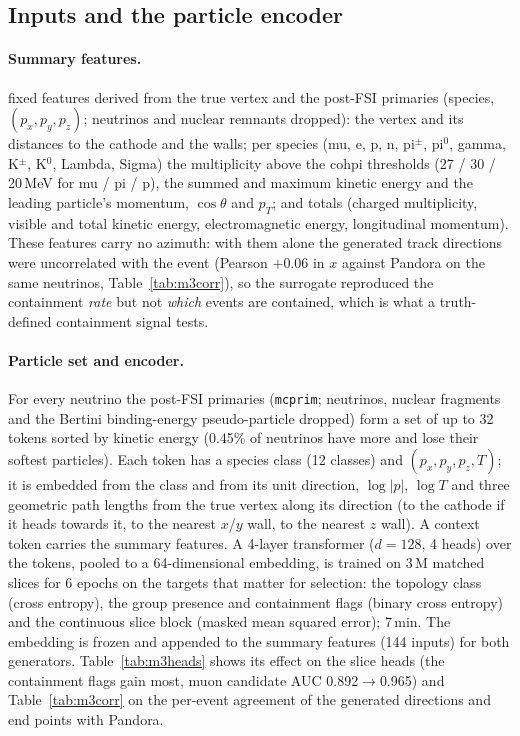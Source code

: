 \documentclass[11pt]{article}
\newcommand{\real}{Pandora}
\begin{document}
\subsection{Inputs and the particle encoder}
\label{sec:inputs}

\paragraph{Summary features.} \nFeat{} fixed features derived from the true vertex and the post-FSI primaries
(species, $(p_x,p_y,p_z)$; neutrinos and nuclear remnants dropped): the vertex and its distances to the cathode
and the walls; per species (mu, e, p, n, pi$^\pm$, pi$^0$, gamma, K$^\pm$, K$^0$, Lambda, Sigma) the multiplicity
above the cohpi thresholds (27 / 30 / 20\,MeV for mu / pi / p), the summed and maximum kinetic energy and the
leading particle's momentum, $\cos\theta$ and $p_T$; and totals (charged multiplicity, visible and total kinetic
energy, electromagnetic energy, longitudinal momentum). These features carry no azimuth: with them alone the
generated track directions were uncorrelated with the event (Pearson $+0.06$ in $x$ against \real{} on the same
neutrinos, Table~\ref{tab:m3corr}), so the surrogate reproduced the containment \emph{rate} but not \emph{which}
events are contained, which is what a truth-defined containment signal tests.

\paragraph{Particle set and encoder.} For every neutrino the post-FSI primaries (\texttt{mcprim}; neutrinos,
nuclear fragments and the Bertini binding-energy pseudo-particle dropped) form a set of up to 32 tokens sorted by
kinetic energy (0.45\% of neutrinos have more and lose their softest particles). Each token has a species class
(12 classes) and $(p_x,p_y,p_z,T)$; it is embedded from the class and from its unit direction, $\log|p|$,
$\log T$ and three geometric path lengths from the true vertex along its direction (to the cathode if it heads
towards it, to the nearest $x$/$y$ wall, to the nearest $z$ wall). A context token carries the summary features.
A 4-layer transformer ($d=128$, 4 heads) over the tokens, pooled to a 64-dimensional embedding, is trained on
3\,M matched slices for 6 epochs on the targets that matter for selection: the topology class (cross entropy),
the group presence and containment flags (binary cross entropy) and the continuous slice block (masked mean
squared error); 7\,min. The embedding is frozen and appended to the summary features (144 inputs) for both
generators. Table~\ref{tab:m3heads} shows its effect on the slice heads (the containment flags gain most, muon
candidate AUC 0.892$\to$0.965) and Table~\ref{tab:m3corr} on the per-event agreement of the generated directions
and end points with \real{}.
\end{document}
